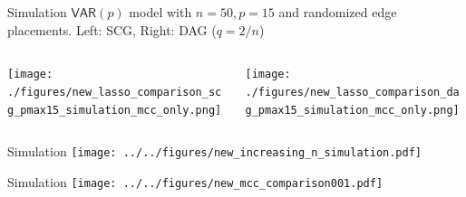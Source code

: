 \documentclass{beamer} %
\def\VAR{\mathsf{VAR}}  %
\begin{document}
\begin{frame}{Simulation}
  $\VAR(p)$ model with $n = 50, p = 15$ and randomized edge placements.  Left: SCG, Right: DAG ($q = 2/n$)
  \begin{columns}
    \begin{column}{0.5\linewidth}
      \texttt{[image: ./figures/new\_lasso\_comparison\_scg\_pmax15\_simulation\_mcc\_only.png]}
    \end{column}

    \begin{column}{0.5\linewidth}
      \texttt{[image: ./figures/new\_lasso\_comparison\_dag\_pmax15\_simulation\_mcc\_only.png]}
    \end{column}
  \end{columns}
\end{frame}

\begin{frame}{Simulation}
  \texttt{[image: ../../figures/new\_increasing\_n\_simulation.pdf]}\pause
\end{frame}

\begin{frame}{Simulation}
  \texttt{[image: ../../figures/new\_mcc\_comparison001.pdf]}
\end{frame}
\end{document}
